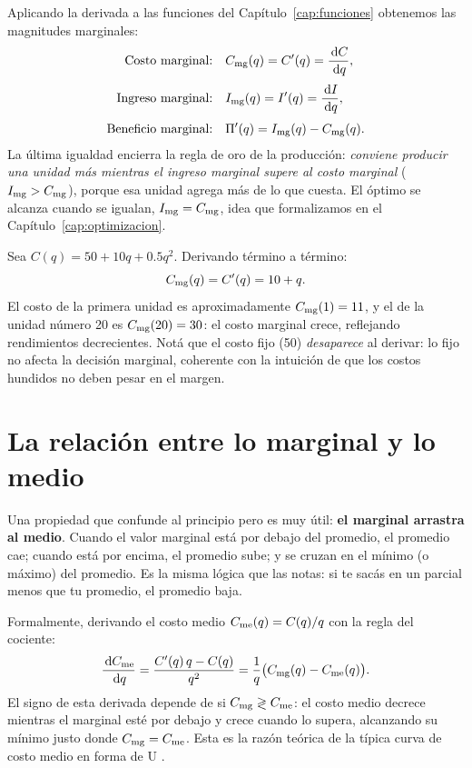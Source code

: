Aplicando la derivada a las funciones del Capítulo~\ref{cap:funciones} obtenemos las magnitudes marginales:
\begin{align}
\text{Costo marginal:}\quad & C_{\mathrm{mg}}(q) = C'(q) = \frac{\,\mathrm{d} C}{\,\mathrm{d} q}, \\[3pt]
\text{Ingreso marginal:}\quad & I_{\mathrm{mg}}(q) = I'(q) = \frac{\,\mathrm{d} I}{\,\mathrm{d} q}, \\[3pt]
\text{Beneficio marginal:}\quad & \Pi'(q) = I_{\mathrm{mg}}(q) - C_{\mathrm{mg}}(q).
\end{align}
La última igualdad encierra la regla de oro de la producción: \emph{conviene producir una unidad más mientras el ingreso marginal supere al costo marginal} ($I_{\mathrm{mg}} > C_{\mathrm{mg}}$), porque esa unidad agrega más de lo que cuesta. El óptimo se alcanza cuando se igualan, $I_{\mathrm{mg}} = C_{\mathrm{mg}}$, idea que formalizamos en el Capítulo~\ref{cap:optimizacion}.

\begin{ejemplo}
Sea $C(q) = 50 + 10q + 0.5q^2$. Derivando término a término:
\[
C_{\mathrm{mg}}(q) = C'(q) = 10 + q.
\]
El costo de la primera unidad es aproximadamente $C_{\mathrm{mg}}(1)=11$, y el de la unidad número 20 es $C_{\mathrm{mg}}(20)=30$: el costo marginal crece, reflejando rendimientos decrecientes. Notá que el costo fijo (50) \emph{desaparece} al derivar: lo fijo no afecta la decisión marginal, coherente con la intuición de que los costos hundidos no deben pesar en el margen.
\end{ejemplo}

\section{La relación entre lo marginal y lo medio}

Una propiedad que confunde al principio pero es muy útil: \textbf{el marginal arrastra al medio}. Cuando el valor marginal está por debajo del promedio, el promedio cae; cuando está por encima, el promedio sube; y se cruzan en el mínimo (o máximo) del promedio. Es la misma lógica que las notas: si te sacás en un parcial menos que tu promedio, el promedio baja.

Formalmente, derivando el costo medio $C_{\mathrm{me}}(q)=C(q)/q$ con la regla del cociente:
\begin{equation}
\frac{\,\mathrm{d} C_{\mathrm{me}}}{\,\mathrm{d} q} = \frac{C'(q)\,q - C(q)}{q^2} = \frac{1}{q}\big(C_{\mathrm{mg}}(q) - C_{\mathrm{me}}(q)\big).
\end{equation}
El signo de esta derivada depende de si $C_{\mathrm{mg}} \gtrless C_{\mathrm{me}}$: el costo medio decrece mientras el marginal esté por debajo y crece cuando lo supera, alcanzando su mínimo justo donde $C_{\mathrm{mg}} = C_{\mathrm{me}}$. Esta es la razón teórica de la típica curva de costo medio en forma de U \cite{nicholson}.

